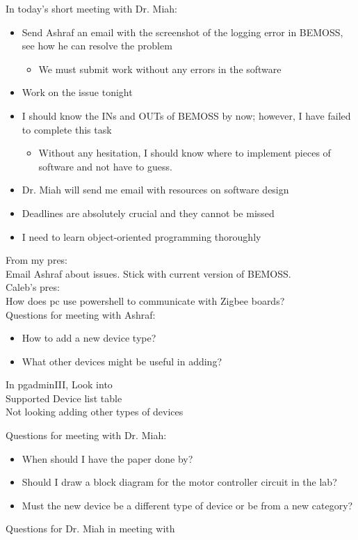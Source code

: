 \documentclass[fontsize=11pt, %
                             paper=letter, %
                             twoside, %
                             captions=tableheading,
                             index=totoc,
                             hyperref]{labbook}
\begin{document}
\begin{addmargin}[0cm]{0cm}
In today's short meeting with Dr. Miah:
\begin{itemize}
\item Send Ashraf an email with the screenshot of the logging error in BEMOSS, see how he can resolve the problem
\begin{itemize}
\item We must submit work without any errors in the software
\end{itemize}
\item Work on the issue tonight
\item I should know the INs and OUTs of BEMOSS by now; however, I have failed to complete this task
\begin{itemize}
\item Without any hesitation, I should know where to implement pieces of software and not have to guess.
\end{itemize}
\item Dr. Miah will send me email with resources on software design
\item Deadlines are absolutely crucial and they cannot be missed
\item I need to learn object-oriented programming thoroughly
\end{itemize}

From my pres:\\
Email Ashraf about issues. Stick with current version of BEMOSS.\\
Caleb's pres:\\
How does pc use powershell to communicate with Zigbee boards?\\

Questions for meeting with Ashraf:
\begin{itemize}
\item How to add a new device type?
\item What other devices might be useful in adding?
\end{itemize}
In pgadminIII,
Look into\\
Supported Device list table\\
Not looking adding other types of devices

Questions for meeting with Dr. Miah:
\begin{itemize}
\item When should I have the paper done by?
\item Should I draw a block diagram for the motor controller circuit in the lab?
\item Must the new device be a different type of device or be from a new category?
\end{itemize}

Questions for Dr. Miah in meeting with 
\end{addmargin}
\end{document}
